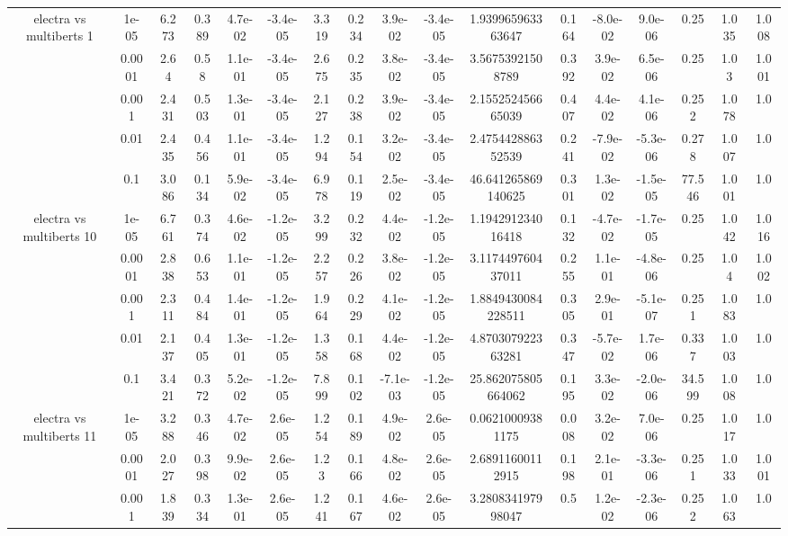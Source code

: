\begin{tabular}{|c|c|c|c|c|c|c|c|c|c|c|c|c|c|c|c|c|}
\hline
\multirow{5}{*}{electra  vs multiberts 1} & 1e-05 & 6.273 & 0.389 & 4.7e-02 & -3.4e-05 & 3.319 & 0.234 & 3.9e-02 & -3.4e-05 & 1.939965963363647 & 0.164 & -8.0e-02 & 9.0e-06 & 0.25 & 1.035 & 1.008 \\
 & 0.0001 & 2.64 & 0.58 & 1.1e-01 & -3.4e-05 & 2.675 & 0.235 & 3.8e-02 & -3.4e-05 & 3.56753921508789 & 0.392 & 3.9e-02 & 6.5e-06 & 0.25 & 1.03 & 1.001 \\
 & 0.001 & 2.431 & 0.503 & 1.3e-01 & -3.4e-05 & 2.127 & 0.238 & 3.9e-02 & -3.4e-05 & 2.155252456665039 & 0.407 & 4.4e-02 & 4.1e-06 & 0.252 & 1.078 & 1.0 \\
 & 0.01 & 2.435 & 0.456 & 1.1e-01 & -3.4e-05 & 1.294 & 0.154 & 3.2e-02 & -3.4e-05 & 2.475442886352539 & 0.241 & -7.9e-02 & -5.3e-06 & 0.278 & 1.007 & 1.0 \\
 & 0.1 & 3.086 & 0.134 & 5.9e-02 & -3.4e-05 & 6.978 & 0.119 & 2.5e-02 & -3.4e-05 & 46.641265869140625 & 0.301 & 1.3e-02 & -1.5e-05 & 77.546 & 1.001 & 1.0 \\
\hline
\multirow{5}{*}{electra  vs multiberts 10} & 1e-05 & 6.761 & 0.374 & 4.6e-02 & -1.2e-05 & 3.299 & 0.232 & 4.4e-02 & -1.2e-05 & 1.194291234016418 & 0.132 & -4.7e-02 & -1.7e-05 & 0.25 & 1.042 & 1.016 \\
 & 0.0001 & 2.838 & 0.653 & 1.1e-01 & -1.2e-05 & 2.257 & 0.226 & 3.8e-02 & -1.2e-05 & 3.117449760437011 & 0.255 & 1.1e-01 & -4.8e-06 & 0.25 & 1.04 & 1.002 \\
 & 0.001 & 2.311 & 0.484 & 1.4e-01 & -1.2e-05 & 1.964 & 0.229 & 4.1e-02 & -1.2e-05 & 1.8849430084228511 & 0.305 & 2.9e-01 & -5.1e-07 & 0.251 & 1.083 & 1.0 \\
 & 0.01 & 2.137 & 0.405 & 1.3e-01 & -1.2e-05 & 1.358 & 0.168 & 4.4e-02 & -1.2e-05 & 4.870307922363281 & 0.347 & -5.7e-02 & 1.7e-06 & 0.337 & 1.003 & 1.0 \\
 & 0.1 & 3.421 & 0.372 & 5.2e-02 & -1.2e-05 & 7.899 & 0.102 & -7.1e-03 & -1.2e-05 & 25.862075805664062 & 0.195 & 3.3e-02 & -2.0e-06 & 34.599 & 1.008 & 1.0 \\
\hline
\multirow{5}{*}{electra  vs multiberts 11} & 1e-05 & 3.288 & 0.346 & 4.7e-02 & 2.6e-05 & 1.254 & 0.189 & 4.9e-02 & 2.6e-05 & 0.06210009381175 & 0.008 & 3.2e-02 & 7.0e-06 & 0.25 & 1.017 & 1.0 \\
 & 0.0001 & 2.027 & 0.398 & 9.9e-02 & 2.6e-05 & 1.23 & 0.166 & 4.8e-02 & 2.6e-05 & 2.68911600112915 & 0.198 & 2.1e-01 & -3.3e-06 & 0.251 & 1.033 & 1.001 \\
 & 0.001 & 1.839 & 0.334 & 1.3e-01 & 2.6e-05 & 1.241 & 0.167 & 4.6e-02 & 2.6e-05 & 3.280834197998047 & 0.5 & 1.2e-02 & -2.3e-06 & 0.252 & 1.063 & 1.0 \\

\end{tabular}
